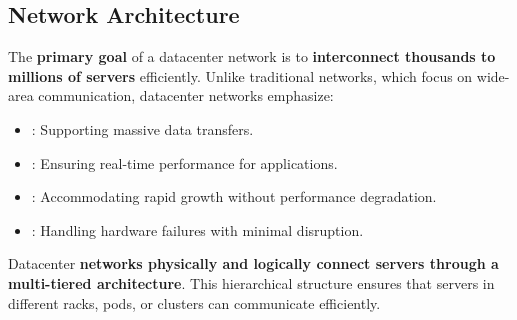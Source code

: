 \subsection{Network Architecture}
The \textbf{primary goal} of a datacenter network is to \textbf{interconnect thousands to millions of servers} efficiently. Unlike traditional networks, which focus on wide-area communication, datacenter networks emphasize:
\begin{itemize}
    \item {}: Supporting massive data transfers.
    \item {}: Ensuring real-time performance for applications.
    \item {}: Accommodating rapid growth without performance degradation.
    \item {}: Handling hardware failures with minimal disruption.
\end{itemize}
Datacenter \textbf{networks physically and logically connect servers through a multi-tiered architecture}. This hierarchical structure ensures that servers in different racks, pods, or clusters can communicate efficiently.

